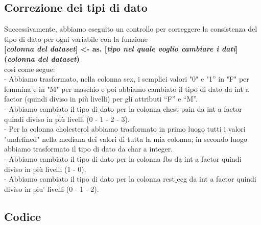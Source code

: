 \documentclass{article}
\begin{document}
\subsection { Correzione dei tipi di dato }
Successivamente, abbiamo eseguito un controllo per correggere la consistenza del tipo di dato per ogni variabile con la funzione 	\\	\textbf{[\textit{colonna del dataset}] \textless- as. [\textit{tipo nel quale voglio cambiare i dati}] (\textit{colonna del dataset})} \\così come segue:\\
-	Abbiamo trasformato, nella colonna sex, i semplici valori "0" e "1” in "F" per femmina e in "M" per maschio e poi abbiamo cambiato il tipo di dato da int a factor (quindi diviso in più livelli) per gli attributi “F” e “M”.\\
-	Abbiamo cambiato il tipo di dato per la colonna chest pain da int a factor quindi diviso in più livelli (0 - 1 - 2 - 3).\\
-	Per la colonna cholesterol abbiamo trasformato in primo luogo tutti i valori "undefined" nella mediana dei valori di tutta la mia colonna;  in secondo luogo abbiamo trasformato il tipo di dato da char a integer.\\
-	Abbiamo cambiato il tipo di dato per la colonna fbs da int a factor quindi diviso in più livelli (1 - 0).\\
-	Abbiamo cambiato il tipo di dato per la colonna rest$\_$ecg da int a factor quindi diviso in piu' livelli (0 - 1 - 2).\\

\subsection { Codice }
\end{document}
